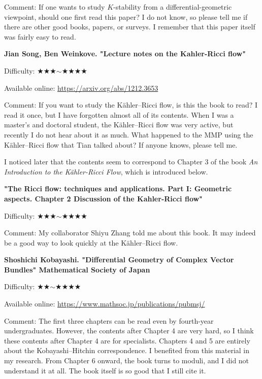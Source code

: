 Comment: If one wants to study $K$-stability from a differential-geometric viewpoint, should one first read this paper? I do not know, so please tell me if there are other good books, papers, or surveys. I remember that this paper itself was fairly easy to read. 

\textbf{Jian Song, Ben Weinkove. "Lecture notes on the Kahler-Ricci flow"}  \vspace{-6pt} 

Difficulty: ★★★$\sim$★★★★ \vspace{-6pt} 

Available online: \url{https://arxiv.org/abs/1212.3653}\vspace{-6pt}

Comment: If you want to study the K\"ahler--Ricci flow, is this the book to read? I read it once, but I have forgotten almost all of its contents. When I was a master's and doctoral student, the K\"ahler--Ricci flow was very active, but recently I do not hear about it as much. What happened to the MMP using the K\"ahler--Ricci flow that Tian talked about? If anyone knows, please tell me.

I noticed later that the contents seem to correspond to Chapter 3 of the book \emph{An Introduction to the Kähler-Ricci Flow}, which is introduced below.
\vspace{8pt}

\textbf{"The Ricci flow: techniques and applications. Part I: Geometric aspects. Chapter 2 Discussion of the Kahler-Ricci flow" }  \vspace{-6pt} 

Difficulty: ★★★$\sim$★★★★ \vspace{-6pt} 

Comment: My collaborator Shiyu Zhang told me about this book. It may indeed be a good way to look quickly at the K\"ahler--Ricci flow. 
\vspace{8pt}

\textbf{Shoshichi Kobayashi. "Differential Geometry of Complex Vector Bundles"  Mathematical Society of Japan}  \vspace{-6pt} 

Difficulty: ★★$\sim$★★★★ \vspace{-6pt} 

Available online: \url{https://www.mathsoc.jp/publications/pubmsj/}\vspace{-6pt}

Comment: The first three chapters can be read even by fourth-year undergraduates. 
However, the contents after Chapter 4 are very hard, so I think these contents after Chapter 4 are  for specialists. 
Chapters 4 and 5 are entirely about the Kobayashi--Hitchin correspondence. I benefited from this material in my research. From Chapter 6 onward, the book turns to moduli, and I did not understand it at all. The book itself is so good that I still cite it.
\vspace{8pt}

